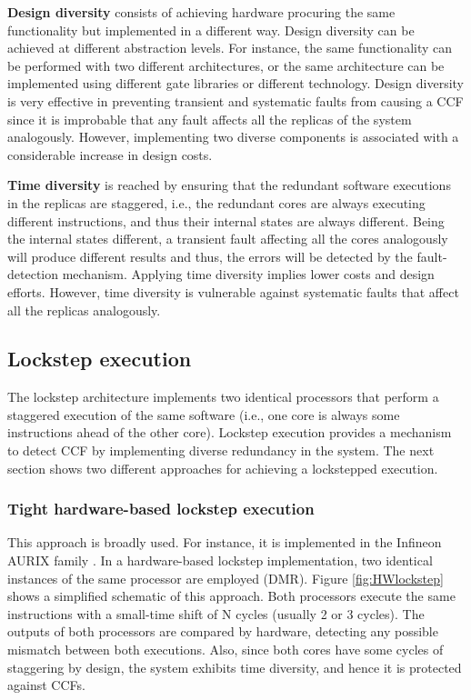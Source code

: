 \textbf{Design diversity} consists of achieving hardware procuring the same functionality but implemented in a different way. Design diversity can be achieved at different abstraction levels. For instance, the same functionality can be performed with two different architectures, or the same architecture can be implemented using different gate libraries or different technology. Design diversity is very effective in preventing transient and systematic faults from causing a CCF since it is improbable that any fault affects all the replicas of the system analogously. However, implementing two diverse components is associated with a considerable increase in design costs.

\textbf{Time diversity} is reached by ensuring that the redundant software executions in the replicas are staggered, i.e., the redundant cores are always executing different instructions, and thus their internal states are always different. Being the internal states different, a transient fault affecting all the cores analogously will produce different results and thus, the errors will be detected by the fault-detection mechanism. Applying time diversity implies lower costs and design efforts. However, time diversity is vulnerable against systematic faults that affect all the replicas analogously. %


\bigskip


\subsection{Lockstep execution}

The lockstep architecture implements two identical processors that perform a staggered execution of the same software (i.e., one core is always some instructions ahead of the other core). Lockstep execution provides a mechanism to detect CCF by implementing diverse redundancy in the system. The next section shows two different approaches for achieving a lockstepped execution.

\subsubsection{Tight hardware-based lockstep execution}

This approach is broadly used. For instance, it is implemented in the Infineon AURIX family \cite{infineon2012aurix}. In a hardware-based lockstep implementation, two identical instances of the same processor are employed (DMR). Figure \ref{fig:HWlockstep} shows a simplified schematic of this approach. Both processors execute the same instructions with a small-time shift of N cycles (usually 2 or 3 cycles). The outputs of both processors are compared by hardware, detecting any possible mismatch between both executions. Also, since both cores have some cycles of staggering by design, the system exhibits time diversity, and hence it is protected against CCFs. 

